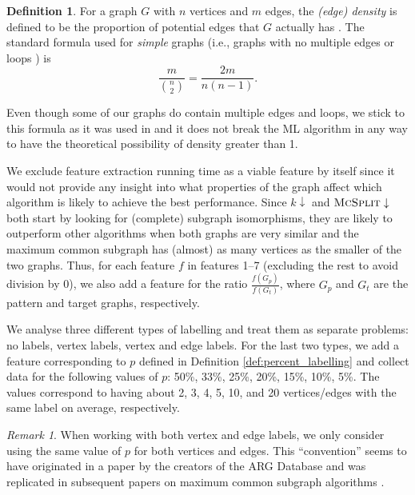 \documentclass{l4proj}
\theoremstyle{definition}
\newtheorem{definition}{Definition}[chapter]
\theoremstyle{remark}
\newtheorem{remark}{Remark}[chapter]
\begin{document}
\begin{definition}
For a graph $G$ with $n$ vertices and $m$ edges, the \emph{(edge) density} is
defined to be the proportion of potential edges that $G$ actually has
\cite{DBLP:books/daglib/0030488}. The standard formula used for \emph{simple}
graphs (i.e., graphs with no multiple edges or loops
\cite{DBLP:books/ws/NishizekiR04}) is
\[ \frac{m}{\binom{n}{2}} = \frac{2m}{n(n-1)}. \]
\end{definition}

Even though some of our graphs do contain multiple edges and loops, we stick to
this formula as it was used in  \cite{DBLP:conf/lion/KotthoffMS16} and it does
not break the ML algorithm in any way to have the theoretical possibility of
density greater than 1.

We exclude feature extraction running time as a viable feature by itself since
it would not provide any insight into what properties of the graph affect which
algorithm is likely to achieve the best performance. Since $k\downarrow$ and
$\textsc{McSplit}\downarrow$ both start by looking for (complete) subgraph
isomorphisms, they are likely to outperform other algorithms when both graphs
are very similar and the maximum common subgraph has (almost) as many vertices
as the smaller of the two graphs. Thus, for each feature $f$ in features 1--7
(excluding the rest to avoid division by 0), we also add a feature for the ratio
$\frac{f(G_p)}{f(G_t)}$, where $G_p$ and $G_t$ are the pattern and target
graphs, respectively.

We analyse three different types of labelling and treat them as separate
problems: no labels, vertex labels, vertex and edge labels. For the last two
types, we add a feature corresponding to $p$ defined in Definition
\ref{def:percent_labelling} and collect data for the following values of $p$:
50\%, 33\%, 25\%, 20\%, 15\%, 10\%, 5\%. The values correspond to having about
2, 3, 4, 5, 10, and 20 vertices/edges with the same label on average,
respectively.

\begin{remark}
  When working with both vertex and edge labels, we only consider using the same
  value of $p$ for both vertices and edges. This ``convention'' seems to have
  originated in a paper by the creators of the ARG Database
  \cite{DBLP:journals/jgaa/ConteFV07} and was replicated in subsequent papers on
  maximum common subgraph algorithms \cite{DBLP:conf/cp/McCreeshNPS16,
    DBLP:conf/cp/NdiayeS11}.
\end{remark}
\end{document}
